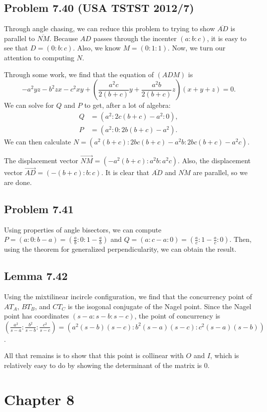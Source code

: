 \documentclass{scrartcl}
\begin{document}
\subsection*{Problem 7.40 (USA TSTST 2012/7)}
Through angle chasing, we can reduce this problem to trying to show $\overline{AD}$ is parallel to $\overline{NM}$.
Because $AD$ passes through the incenter $(a : b : c)$, it is easy to see that $D = (0 : b : c)$.
Also, we know $M = (0 : 1 : 1)$. Now, we turn our attention to computing $N$.

Through some work, we find that the equation of $(ADM)$ is
\[ -a^2yz - b^2zx - c^2xy + \left( \frac{a^2c}{2(b+c)}y + \frac{a^2b}{2(b+c)}z \right)(x + y + z) = 0. \]
We can solve for $Q$ and $P$ to get, after a lot of algebra:
\begin{align*}
    Q &= (a^2 : 2c(b+c) - a^2 : 0), \\
    P &= (a^2 : 0 : 2b(b+c) - a^2).
\end{align*}
We can then calculate $N = (a^2(b+c) : 2bc(b+c) - a^2b : 2bc(b+c) - a^2c)$.

The displacement vector $\overrightarrow{NM} = (-a^2(b+c) : a^2b : a^2c)$. Also, the displacement vector $\overrightarrow{AD} = (-(b + c) : b : c)$. It is clear that $\overline{AD}$ and $\overline{NM}$ are parallel, so we are done.
\subsection*{Problem 7.41}
Using properties of angle bisectors, we can compute $P = (a : 0 : b-a) = (\frac{a}{b} : 0 : 1 - \frac{a}{b})$ and
$Q = (a : c-a : 0) = (\frac{a}{c} : 1 - \frac{a}{c} : 0)$. Then, using the theorem for generalized perpendicularity, we can obtain the result.
\subsection*{Lemma 7.42}
Using the mixtilinear incircle configuration, we find that the concurrency point of $AT_A$, $BT_B$, and $CT_C$ is
the isogonal conjugate of the Nagel point. Since the Nagel point has coordinates $(s-a : s-b : s-c)$, the point
of concurrency is $(\frac{a^2}{s-a} : \frac{b^2}{s-b} : \frac{c^2}{s-c}) = (a^2(s-b)(s-c) : b^2(s-a)(s-c) : c^2(s-a)(s-b))$.

All that remains is to show that this point is collinear with $O$ and $I$, which is relatively easy to do by showing the determinant of the matrix is $0$.

\section*{Chapter 8}
\end{document}
